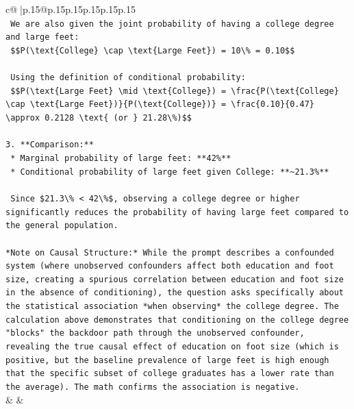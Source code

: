 \documentclass{article}
\begin{document}
{\begin{supertabular}{c@{$\;$}|p{.15\linewidth}@{}p{.15\linewidth}p{.15\linewidth}p{.15\linewidth}p{.15\linewidth}p{.15\linewidth}}
{{{\\ 
\texttt{    We are also given the joint probability of having a college degree and large feet:} \\
\texttt{    \$\$P(\textbackslash{}text\{College\} \textbackslash{}cap \textbackslash{}text\{Large Feet\}) = 10\textbackslash{}\% = 0.10\$\$} \\
\\ 
\texttt{    Using the definition of conditional probability:} \\
\texttt{    \$\$P(\textbackslash{}text\{Large Feet\} \textbackslash{}mid \textbackslash{}text\{College\}) = \textbackslash{}frac\{P(\textbackslash{}text\{College\} \textbackslash{}cap \textbackslash{}text\{Large Feet\})\}\{P(\textbackslash{}text\{College\})\} = \textbackslash{}frac\{0.10\}\{0.47\} \textbackslash{}approx 0.2128 \textbackslash{}text\{ (or \} 21.28\textbackslash{}\%)\$\$} \\
\\ 
\texttt{3.  **Comparison:**} \\
\texttt{    *   Marginal probability of large feet: **42\%**} \\
\texttt{    *   Conditional probability of large feet given College: **\textasciitilde{}21.3\%**} \\
\\ 
\texttt{    Since \$21.3\textbackslash{}\% < 42\textbackslash{}\%\$, observing a college degree or higher significantly reduces the probability of having large feet compared to the general population.} \\
\\ 
\texttt{*Note on Causal Structure:* While the prompt describes a confounded system (where unobserved confounders affect both education and foot size, creating a spurious correlation between education and foot size in the absence of conditioning), the question asks specifically about the statistical association *when observing* the college degree. The calculation above demonstrates that conditioning on the college degree "blocks" the backdoor path through the unobserved confounder, revealing the true causal effect of education on foot size (which is positive, but the baseline prevalence of large feet is high enough that the specific subset of college graduates has a lower rate than the average). The math confirms the association is negative.} \\
            }
        }
    }
    & & \\ \\


\end{supertabular}}
\end{document}
